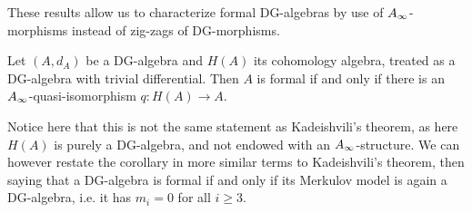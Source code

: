 These results allow us to characterize formal DG-algebras by use of $A_{\infty}$-morphisms instead of zig-zags of DG-morphisms. 


\begin{corollary}\label{cor:formal}
Let $(A, d_A)$ be a DG-algebra and $H(A)$ its cohomology algebra, treated as a DG-algebra with trivial differential. Then $A$ is formal if and only if there is an $A_{\infty}$-quasi-isomorphism $q\colon H(A)\longrightarrow A$. 
\end{corollary}

Notice here that this is not the same statement as Kadeishvili's theorem, as here $H(A)$ is purely a DG-algebra, and not endowed with an $A_{\infty}$-structure. We can however restate the corollary in more similar terms to Kadeishvili's theorem, then saying that a DG-algebra is formal if and only if its Merkulov model is again a DG-algebra, i.e. it has $m_i=0$ for all $i\geq 3$. 





